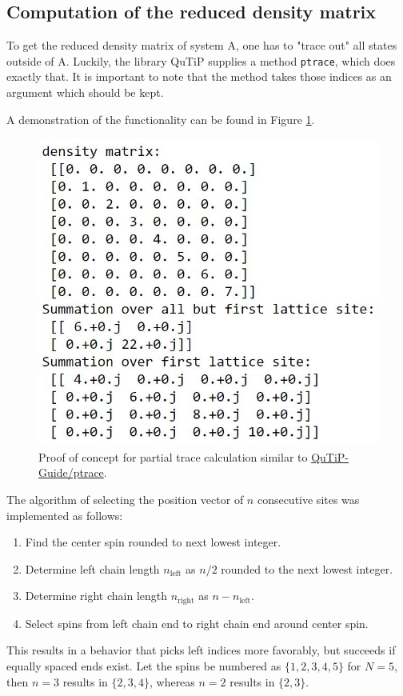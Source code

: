 \documentclass[reprint,amsmath,amssymb,aps,prb]{revtex4-2}
\begin{document}
\subsection{Computation of the reduced density matrix}

To get the reduced density matrix of system A, one has to "trace out" all states outside of A. Luckily, the library QuTiP supplies a method \texttt{ptrace}, which does exactly that. It is important to note that the method takes those indices as an argument which should be kept.\cite{Johansson2012}

A demonstration of the functionality can be found in Figure \ref{fig:partialtrace_proof_of_concept}.

\begin{figure}[h!]
\centering
\includegraphics[width=0.7\linewidth]{figures/partialtrace_proof_of_concept}
\caption{Proof of concept for partial trace calculation similar to \protect\hyperlink{http://qutip.org/docs/3.1.0/guide/guide-tensor.html}{QuTiP-Guide/ptrace}.}
\label{fig:partialtrace_proof_of_concept}
\end{figure}

The algorithm of selecting the position vector of $n$ consecutive sites was implemented as follows: 
\begin{enumerate}
	\item Find the center spin rounded to next lowest integer.
	\item Determine left chain length $n_\text{left}$ as $n/2$ rounded to the next lowest integer.
	\item Determine right chain length $n_\text{right}$ as $n-n_\text{left}$.
	\item Select spins from left chain end to right chain end around center spin.
\end{enumerate}
This results in a behavior that picks left indices more favorably, but succeeds if equally spaced ends exist. Let the spins be numbered as $\{1, 2, 3, 4, 5\}$ for $N=5$, then  $n=3$ results in $\{2, 3, 4\}$, whereas $n=2$ results in $\{2, 3\}$.
\end{document}
